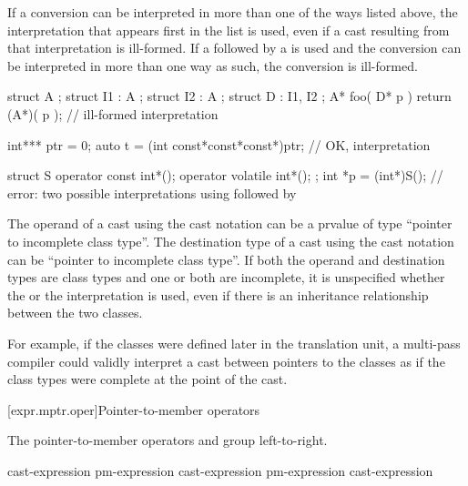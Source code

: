 If a conversion can be interpreted in more than one of the ways listed
above, the interpretation that appears first in the list is used, even
if a cast resulting from that interpretation is ill-formed. If a
 followed by a  is used and
the conversion can be interpreted in more than one way as such,
the conversion is
ill-formed.
\begin{example}
\begin{codeblock}
struct A { };
struct I1 : A { };
struct I2 : A { };
struct D : I1, I2 { };
A* foo( D* p ) {
  return (A*)( p );             // ill-formed  interpretation
}

int*** ptr = 0;
auto t = (int const*const*const*)ptr;   // OK,  interpretation

struct S {
  operator const int*();
  operator volatile int*();
};
int *p = (int*)S();     // error: two possible interpretations using  followed by 
\end{codeblock}
\end{example}

\pnum
{}%
The operand of a cast using the cast notation can be a prvalue of type
``pointer to incomplete class type''. The destination type of a cast
using the cast notation can be ``pointer to incomplete class type''. If
both the operand and destination types are class types and one or both
are incomplete, it is unspecified whether the  or the
 interpretation is used, even if there is an
inheritance relationship between the two classes.
\begin{note}
For example, if the classes were defined later in the translation unit,
a multi-pass compiler could validly interpret a cast between
pointers to the classes as if the class types were complete at the point
of the cast.
\end{note}

[expr.mptr.oper]{Pointer-to-member operators}

\pnum
{}%
%
%
%
%
%
The pointer-to-member operators \tcode{->*} and  group
left-to-right.

\begin{bnf}
\br
    cast-expression\br
    pm-expression  cast-expression\br
    pm-expression \terminal{->*} cast-expression
\end{bnf}


